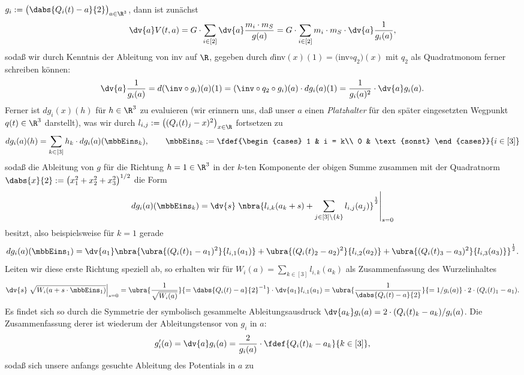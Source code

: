 \documentclass{subfiles}
\begin{document}
    $g_i:=\bigl(\dabs{Q_i(t)-a}{2}\bigr)_{a\in\R^3}$, dann ist zunächst
    \[
        \dv{a}V(t,a) = G\cdot\sum_{i\in[2]}\dv{a}\frac{m_i\cdot m_S}{g(a)} = G\cdot\sum_{i\in[2]}m_i\cdot m_S\cdot\dv{a}\frac{1}{g_i(a)},
    \]
    sodaß wir durch Kenntnis der Ableitung von inv auf $\R$, gegeben durch $d$inv$(x)(1) = ($inv$\circ q_2)(x)$ mit $q_2$ als Quadratmonom ferner schreiben können:
    \[
        \dv{a}\frac{1}{g_i(a)} = d(\inv\circ g_i)(a)(1) = (\inv\circ q_2\circ g_i)(a)\cdot dg_i(a)(1) = \frac{1}{g_i(a)^2}\cdot \dv{a}g_i(a).  
    \]
    Ferner ist $dg_i(x)(h)$ für $h\in\R^3$ zu evaluieren (wir erinnern uns, daß unser $a$ einen \emph{Platzhalter} für den später eingesetzten Wegpunkt $q(t)\in\R^3$ darstellt), was wir durch $l_{i,j}:=\bigl((Q_i(t)_j - x)^2\bigr)_{x\in\R}$ fortsetzen zu
    \[
        dg_i(a)(h) = \sum_{k\in[3]}h_k\cdot dg_i(a)(\mbbEins_k), \qquad\mbbEins_{k}:=\fdef{\begin{cases}
            1 & i = k\\
            0 & \text{sonst}
        \end{cases}}{i\in[3]}
    \]
    sodaß die Ableitung von $g$ für die Richtung $h=1\in\R^3$ in der $k$-ten Komponente der obigen Summe zusammen mit der Quadratnorm $\dabs{x}{2} := \bigl(x_1^2 + x_2^2 + x_3^2\bigr)^{1/2}$ die Form 
    \[
        dg_i(a)(\mbbEins_k) = \dv{s}\left.\nbra{l_{i,k}(a_k + s) + \sum_{j\in[3]\setminus{\{k\}}}l_{i,j}(a_j)}^{\frac12}\right|_{s=0}
    \]
    besitzt, also beispielsweise für $k=1$ gerade
    \[
        dg_i(a)(\mbbEins_1) = \dv{a_1}\nbra{\ubra{(Q_i(t)_1 - a_1)^2}{l_{i,1}(a_1)} + \ubra{(Q_i(t)_2 - a_2)^2}{l_{i,2}(a_2)} + \ubra{(Q_i(t)_3 - a_3)^2}{l_{i,3}(a_3)}}^{\frac12}.
    \]
    Leiten wir diese erste Richtung speziell ab, so erhalten wir für $W_i(a) = \sum_{k\in[3]}l_{i,k}(a_k)$ als Zusammenfassung des Wurzelinhaltes
    \[
        \dv{s}\left.\sqrt{W_i(a + s\cdot\mbbEins_1)}\right|_{s=0} = \ubra{\frac{1}{\sqrt{W_i(a)}}}{=\dabs{Q_i(t) - a}{2}^{-1}}\cdot\dv{a_1}l_{i,1}(a_1) = \ubra{\frac{1}{\dabs{Q_i(t) - a}{2}}}{= 1/g_i(a)}\cdot 2\cdot (Q_i(t)_1 - a_1). 
    \]
    Es findet sich so durch die Symmetrie der symbolisch gesammelte Ableitungsausdruck $\dv{a_k}g_i(a) = 2\cdot (Q_i(t)_k - a_k) / g_i(a)$. Die Zusammenfassung derer ist wiederum der Ableitungstensor von $g_i$ in $a$:
    \[
        g_i'(a) = \dv{a}g_i(a) = \frac{2}{g_i(a)}\cdot\fdef{Q_i(t)_k - a_k}{k\in[3]},
    \]
    sodaß sich unsere anfangs gesuchte Ableitung des Potentials in $a$ zu 
\end{document}
